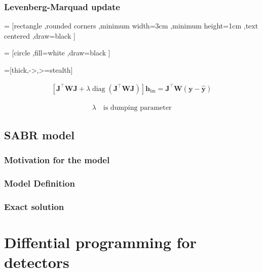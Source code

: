 \documentclass[]{beamer}
\begin{document}
\begin{frame}
    \frametitle{Levenberg-Marquad update}

     = [rectangle
                        ,rounded corners
                        ,minimum width=3cm
                        ,minimum height=1cm
                        ,text centered
                        ,draw=black
                        ]

     = [circle
                        ,fill=white
                        ,draw=black
                       ]                    

    =[thick,->,>=stealth]                    
    
    \begin{eqnarray*}
        \left[\boldsymbol{J}^{\top} \boldsymbol{W} \boldsymbol{J}
              +\lambda \operatorname{diag}\left(\boldsymbol{J}^{\top} \boldsymbol{W} \boldsymbol{J}\right)
        \right]
         \boldsymbol{h}_{\mathrm{lm}}
         =\boldsymbol{J}^{\top} \boldsymbol{W}(\boldsymbol{y}-\hat{\boldsymbol{y}})
    \end{eqnarray*}

    \begin{eqnarray*}
        \lambda \quad \text{is dumping parameter}
    \end{eqnarray*}
    
\end{frame}


\subsection{SABR model}

\begin{frame}
    \frametitle{Motivation for the model}
\end{frame}

\begin{frame}
    \frametitle{Model Definition}
\end{frame}


\begin{frame}
    \frametitle{Exact solution}
\end{frame}



\subsection{}

\section{Diffential programming for detectors}
\begin{frame}
   
\end{frame}
\end{document}
